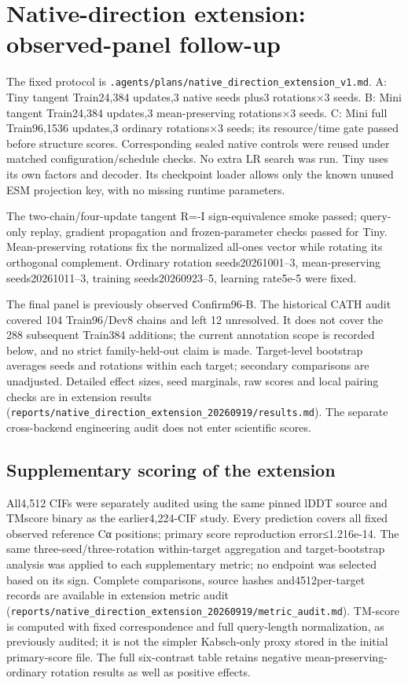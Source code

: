 \section{Native-direction extension: observed-panel follow-up}\label{native-direction-extension-observed-panel-follow-up}

The fixed protocol is \nolinkurl{.agents/plans/native_direction_extension_v1.md}.
A: Tiny tangent Train24,384 updates,3 native seeds plus3 rotations×3 seeds.
B: Mini tangent Train24,384 updates,3 mean-preserving rotations×3 seeds.
C: Mini full Train96,1536 updates,3 ordinary rotations×3 seeds; its resource/time
gate passed before structure scores. Corresponding sealed native controls were
reused under matched configuration/schedule checks. No extra LR search was run.
Tiny uses its own factors and decoder. Its checkpoint loader allows only the
known unused ESM projection key, with no missing runtime parameters.

The two-chain/four-update tangent R=-I sign-equivalence smoke passed; query-only
replay, gradient propagation and frozen-parameter checks passed for Tiny.
Mean-preserving rotations fix the normalized all-ones vector while rotating its
orthogonal complement. Ordinary rotation seeds20261001--3, mean-preserving
seeds20261011--3, training seeds20260923--5, learning rate5e-5 were fixed.

The final panel is previously observed Confirm96-B. The historical CATH audit
covered 104 Train96/Dev8 chains and left 12 unresolved. It does not cover the
288 subsequent Train384 additions; the current annotation scope is recorded
below, and no strict family-held-out claim is made. Target-level bootstrap averages seeds and rotations within each
target; secondary comparisons are unadjusted. Detailed effect sizes, seed
marginals, raw scores and local pairing checks are in
extension results (\nolinkurl{reports/native_direction_extension_20260919/results.md}).
The separate cross-backend engineering audit does not enter scientific scores.

\subsection{Supplementary scoring of the extension}\label{supplementary-scoring-of-the-extension}

All4,512 CIFs were separately audited using the same pinned lDDT source and
TMscore binary as the earlier4,224-CIF study. Every prediction covers all fixed
observed reference Cα positions; primary score reproduction error≤1.216e-14.
The same three-seed/three-rotation within-target aggregation and target-bootstrap
analysis was applied to each supplementary metric; no endpoint was selected
based on its sign. Complete comparisons, source hashes and4512per-target
records are available in extension metric audit (\nolinkurl{reports/native_direction_extension_20260919/metric_audit.md}).
TM-score is computed with fixed correspondence and full query-length
normalization, as previously audited; it is not the simpler Kabsch-only proxy
stored in the initial primary-score file. The full six-contrast table retains
negative mean-preserving-ordinary rotation results as well as positive effects.

